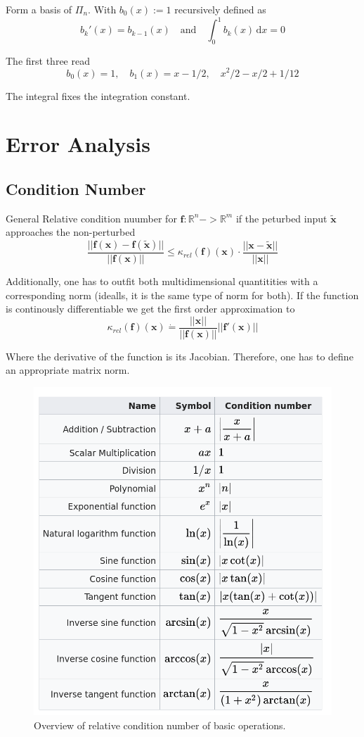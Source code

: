 \documentclass[
    a4paper,
    11pt
]{article}
\begin{document}
Form a basis of $\Pi_n$.
With $ b_0(x) := 1$ recursively defined as
\begin{equation}
    b_k'(x) = b_{k-1}(x) \quad \text{and} \quad \int_0^1 b_k(x) \, \mathrm{d}x = 0
\end{equation}

The first three read
\begin{equation}
    b_0(x) = 1, \quad b_1(x)=x - 1/2, \quad x^2/2 - x/2 + 1/12
\end{equation}

The integral fixes the integration constant.



\section{Error Analysis}

\subsection{Condition Number}

General Relative condition nuumber for $\mathbf{f}:\mathbb{R}^n -> \mathbb{R}^m$ if the
peturbed input $\mathbf{\tilde{x}}$ approaches the non-perturbed
\begin{equation}
    \frac{||\mathbf{f}(\mathbf{x}) -
    \mathbf{f}(\mathbf{\tilde{x}})||}{||\mathbf{f}(\mathbf{x})||} \le
    \kappa_{rel}(\mathbf{f})(\mathbf{x}) \cdot
    \frac{||\mathbf{x} - \mathbf{\tilde{x}}||}{||\mathbf{x}||}
\end{equation}

Additionally, one has to outfit both multidimensional quantitities with a
corresponding norm (idealls, it is the same type of norm for both). If the
function is continously differentiable we get the first order approximation to
\begin{equation}
    \kappa_{rel}(\mathbf{f})(\mathbf{x}) \dot{=}
    \frac{||\mathbf{x}||}{||\mathbf{f}(\mathbf{x})||}
    ||\mathbf{f}'(\mathbf{x})||
\end{equation}

Where the derivative of the function is its Jacobian. Therefore, one has to
define an appropriate matrix norm.

\begin{figure}[H]
    \centering
    \includegraphics[width=0.5\linewidth]{basicOperations.png}
    \caption{Overview of relative condition number of basic operations.}
\end{figure}
\end{document}
